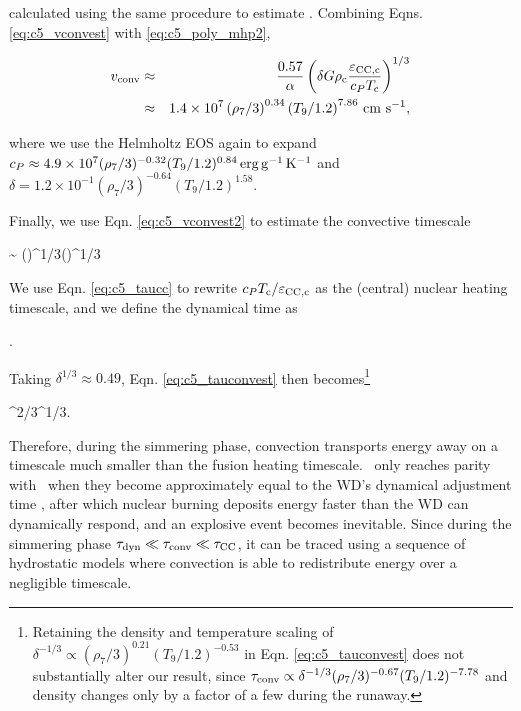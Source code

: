 \noindent calculated using the same procedure to estimate \Lconv.  Combining Eqns. \ref{eq:c5_vconvest} with \ref{eq:c5_poly_mhp2},

\begin{eqnarray}
\vconv &\approx& \frac{0.57}{\alpha}\left(\delta G\rhoc\frac{\epscentral}{c_P \Tc}\right)^{1/3} \nonumber \\
&\approx& 1.4\times10^{7}\left(\rho_7/3\right)^{0.34}\left(T_9/1.2\right)^{7.86}\,\cmpsec,
\label{eq:c5_vconvest2}
\end{eqnarray}

\noindent where we use the Helmholtz EOS again to expand $c_P \approx 4.9\times10^7(\rho_7/3)^{-0.32}(T_9/1.2)^{0.84}\,\mathrm{erg}\,\mathrm{g}^{-1}\,\mathrm{K}^{-1}$ and $\delta = 1.2\times10^{-1}(\rho_7/3)^{-0.64}(T_9/1.2)^{1.58}$.

Finally, we use Eqn. \ref{eq:c5_vconvest2} to estimate the convective timescale

\eqbegin
\tauconv \sim {} \approx {}\left(\right)^{1/3}\left(\right)^{1/3}
\label{eq:c5_tauconvest}
\eqend

\noindent We use Eqn. \ref{eq:c5_taucc} to rewrite $c_P\Tc/\epscentral$ as the (central) nuclear heating timescale, and we define the dynamical time as

\eqbegin
\taudyn \equiv {}.
\label{eq:c5_taudyn}
\eqend


\noindent Taking $\delta^{1/3} \approx 0.49$, Eqn. \ref{eq:c5_tauconvest} then becomes\footnote{Retaining the density and temperature scaling of $\delta^{-1/3} \propto (\rho_7/3)^{0.21}(T_9/1.2)^{-0.53}$ in Eqn. \ref{eq:c5_tauconvest} does not substantially alter our result, since $\tauconv \propto \delta^{-1/3}(\rho_7/3)^{-0.67}(T_9/1.2)^{-7.78}$ and density changes only by a factor of a few during the runaway.}

\eqbegin
\tauconv {}\taudyn^{2/3}\taucc^{1/3}.
\label{eq:c5_tauconvest2}
\eqend

Therefore, during the simmering phase, convection transports energy away on a timescale much smaller than the fusion heating timescale.  \taucc\ only reaches parity with \tauconv\ when they become approximately equal to the WD's dynamical adjustment time \taudyn, after which nuclear burning deposits energy faster than the WD can dynamically respond, and an explosive event becomes inevitable.  Since during the simmering phase $\taudyn \ll \tauconv \ll \taucc$, it can be traced using a sequence of hydrostatic models where convection is able to redistribute energy over a negligible timescale.

